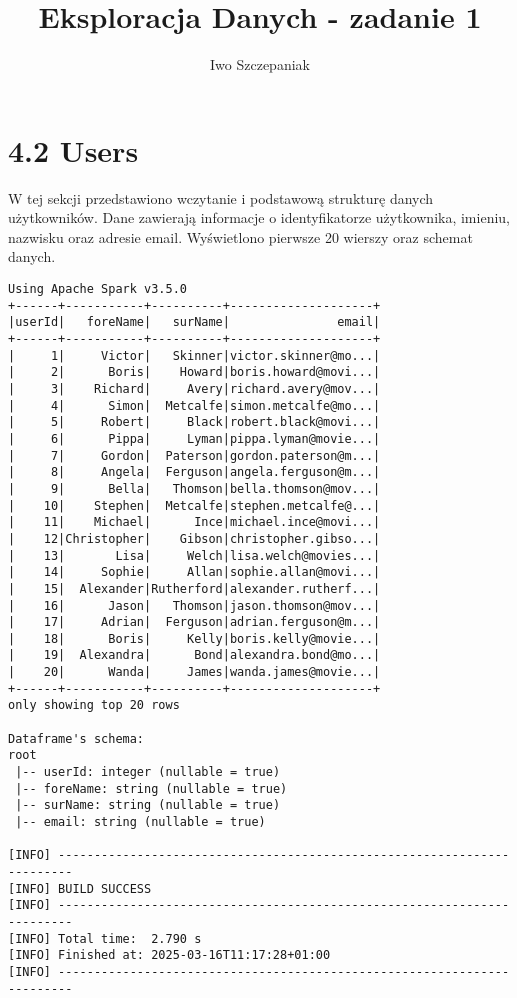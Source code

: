 \documentclass{article}
\title{Eksploracja Danych - zadanie 1}
\author{Iwo Szczepaniak}
\begin{document}
\maketitle

\section{4.2 Users}
W tej sekcji przedstawiono wczytanie i podstawową strukturę danych użytkowników. Dane zawierają informacje o identyfikatorze użytkownika, imieniu, nazwisku oraz adresie email. Wyświetlono pierwsze 20 wierszy oraz schemat danych.

\begin{verbatim}
Using Apache Spark v3.5.0
+------+-----------+----------+--------------------+
|userId|   foreName|   surName|               email|
+------+-----------+----------+--------------------+
|     1|     Victor|   Skinner|victor.skinner@mo...|
|     2|      Boris|    Howard|boris.howard@movi...|
|     3|    Richard|     Avery|richard.avery@mov...|
|     4|      Simon|  Metcalfe|simon.metcalfe@mo...|
|     5|     Robert|     Black|robert.black@movi...|
|     6|      Pippa|     Lyman|pippa.lyman@movie...|
|     7|     Gordon|  Paterson|gordon.paterson@m...|
|     8|     Angela|  Ferguson|angela.ferguson@m...|
|     9|      Bella|   Thomson|bella.thomson@mov...|
|    10|    Stephen|  Metcalfe|stephen.metcalfe@...|
|    11|    Michael|      Ince|michael.ince@movi...|
|    12|Christopher|    Gibson|christopher.gibso...|
|    13|       Lisa|     Welch|lisa.welch@movies...|
|    14|     Sophie|     Allan|sophie.allan@movi...|
|    15|  Alexander|Rutherford|alexander.rutherf...|
|    16|      Jason|   Thomson|jason.thomson@mov...|
|    17|     Adrian|  Ferguson|adrian.ferguson@m...|
|    18|      Boris|     Kelly|boris.kelly@movie...|
|    19|  Alexandra|      Bond|alexandra.bond@mo...|
|    20|      Wanda|     James|wanda.james@movie...|
+------+-----------+----------+--------------------+
only showing top 20 rows

Dataframe's schema:
root
 |-- userId: integer (nullable = true)
 |-- foreName: string (nullable = true)
 |-- surName: string (nullable = true)
 |-- email: string (nullable = true)

[INFO] ------------------------------------------------------------------------
[INFO] BUILD SUCCESS
[INFO] ------------------------------------------------------------------------
[INFO] Total time:  2.790 s
[INFO] Finished at: 2025-03-16T11:17:28+01:00
[INFO] ------------------------------------------------------------------------
\end{verbatim}
\end{document}

